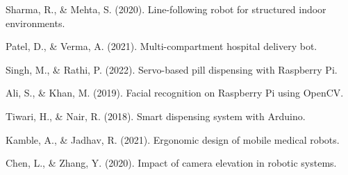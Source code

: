 \begin{thebibliography}{9}

Sharma, R., \& Mehta, S. (2020). Line-following robot for structured indoor environments.

Patel, D., \& Verma, A. (2021). Multi-compartment hospital delivery bot.

Singh, M., \& Rathi, P. (2022). Servo-based pill dispensing with Raspberry Pi.

Ali, S., \& Khan, M. (2019). Facial recognition on Raspberry Pi using OpenCV.

Tiwari, H., \& Nair, R. (2018). Smart dispensing system with Arduino.

Kamble, A., \& Jadhav, R. (2021). Ergonomic design of mobile medical robots.

Chen, L., \& Zhang, Y. (2020). Impact of camera elevation in robotic systems.

\end{thebibliography}
